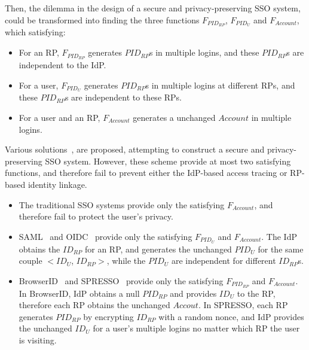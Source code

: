 Then, the dilemma in the design of a secure and privacy-preserving SSO system, could be transformed into finding the three functions  $F_{PID_{RP}}$,  $F_{PID_{U}}$ and $F_{Account}$, which satisfying:
\begin{itemize}
  \item For an RP, $F_{PID_{RP}}$ generates $PID_{RP}$s in multiple logins, and these  $PID_{RP}$s are independent to the IdP.
  \item For a user, $F_{PID_{U}}$ generates $PID_{RP}$s in multiple logins at different RPs, and these $PID_{RP}$s are independent to these RPs.
  \item For a user and an RP, $F_{Account}$ generates a unchanged $Account$ in multiple logins.
\end{itemize}


Various solutions~\cite{OpenIDConnect, SAMLIdentifier,BrowserID,SPRESSO}, are proposed, attempting to construct a secure and privacy-preserving SSO system.
However, these scheme provide at most two satisfying functions, and therefore fail to prevent either the IdP-based access tracing or RP-based identity linkage.
\begin{itemize}
  \item The traditional SSO systems provide only the satisfying $F_{Account}$, and therefore fail to protect the user's privacy.
  \item SAML~\cite{SAMLIdentifier} and OIDC~\cite{OpenIDConnect} provide only the satisfying $F_{PID_{U}}$ and $F_{Account}$.
        The IdP obtains the $ID_{RP}$ for an RP, and generates the unchanged $PID_{U}$ for the same couple $<ID_{U}$, $ID_{RP}>$,
        while the $PID_{U}$ are independent for different $ID_{RP}$s.
  \item BrowserID~\cite{BrowserID} and SPRESSO~\cite{SPRESSO} provide only the satisfying $F_{PID_{RP}}$ and $F_{Account}$.
        In BrowserID, IdP obtains a null $PID_{RP}$ and provides $ID_U$ to the RP, therefore each RP obtains the unchanged $Accout$.
        In SPRESSO, each RP generates $PID_{RP}$ by encrypting $ID_{RP}$ with a random nonce,
        and IdP provides the unchanged $ID_U$ for a user's multiple logins no matter which RP the user is visiting.
\end{itemize}

